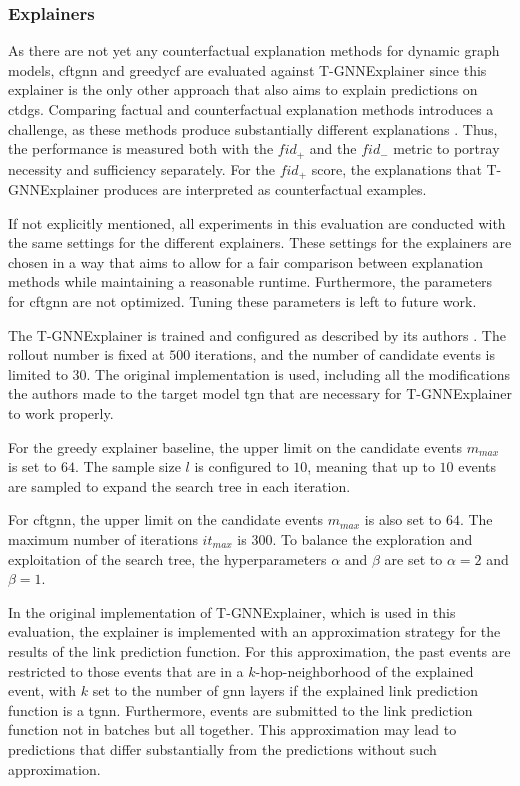 \subsubsection{Explainers}
\label{s_Evaluation_Setup_Explainers}
As there are not yet any counterfactual explanation methods for dynamic graph models, \gls{cftgnn} and \gls{greedycf} are evaluated against T-GNNExplainer \cite{xia_explaining_2023} since this explainer is the only other approach that also aims to explain predictions on \glspl{ctdg}. Comparing factual and counterfactual explanation methods introduces a challenge, as these methods produce substantially different explanations \cite{tan_learning_2022}. Thus, the performance is measured both with the $fid_+$ and the $fid_-$ metric to portray necessity and sufficiency separately. For the $fid_+$ score, the explanations that T-GNNExplainer produces are interpreted as counterfactual examples.

If not explicitly mentioned, all experiments in this evaluation are conducted with the same settings for the different explainers. These settings for the explainers are chosen in a way that aims to allow for a fair comparison between explanation methods while maintaining a reasonable runtime. Furthermore, the parameters for \gls{cftgnn} are not optimized. Tuning these parameters is left to future work.

The T-GNNExplainer is trained and configured as described by its authors \cite{xia_explaining_2023}. The rollout number is fixed at $500$ iterations, and the number of candidate events is limited to $30$. The original implementation is used, including all the modifications the authors made to the target model \gls{tgn} that are necessary for T-GNNExplainer to work properly.

For the greedy explainer baseline, the upper limit on the candidate events $m_{max}$ is set to $64$. The sample size $l$ is configured to $10$, meaning that up to $10$ events are sampled to expand the search tree in each iteration.

For \gls{cftgnn}, the upper limit on the candidate events $m_{max}$ is also set to $64$. The maximum number of iterations $it_{max}$ is $300$. To balance the exploration and exploitation of the search tree, the hyperparameters $\alpha$ and $\beta$ are set to $\alpha = 2$ and $\beta = 1$.


In the original implementation of T-GNNExplainer, which is used in this evaluation, the explainer is implemented with an approximation strategy for the results of the link prediction function. For this approximation, the past events are restricted to those events that are in a $k$-hop-neighborhood of the explained event, with $k$ set to the number of \gls{gnn} layers if the explained link prediction function is a \gls{tgnn}. Furthermore, events are submitted to the link prediction function not in batches but all together. This approximation may lead to predictions that differ substantially from the predictions without such approximation.

